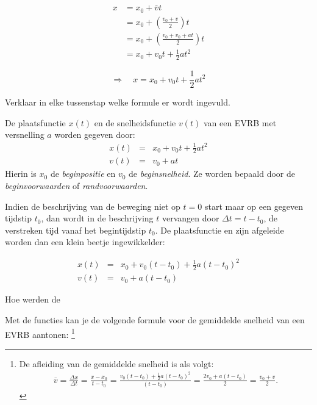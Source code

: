 \documentclass{ximera}
\begin{document}
\begin{align*}
	x &= x_0 + \bar{v}t \\
	  &= x_0 + \left( \frac{v_0 + v}{2} \right)t \\
	  &= x_0 + \left( \frac{v_0 + v_0 + at}{2} \right)t \\
	  &= x_0 + v_0 t + \frac{1}{2} at^2
\end{align*}

\[
\Rightarrow \quad x = x_0 + v_0 t + \frac{1}{2}at^2 
\]

\begin{quickquestion*}{}{}
	Verklaar in elke tussenstap welke formule er wordt ingevuld. 
\end{quickquestion*}


\begin{theorem}
De plaatsfunctie $x(t)$ en de snelheidsfunctie $v(t)$ van een EVRB met versnelling $a$ worden gegeven door:
\[
\begin{array}{rcl}
x(t)&=&x_0+v_0t+\frac{1}{2}at^2\\
v(t)&=&v_0+at
\end{array}
\]
Hierin is $x_0$ de \textit{beginpositie} en $v_0$ de \textit{beginsnelheid}. Ze worden bepaald door de \textit{beginvoorwaarden} of \textit{randvoorwaarden}.
\end{theorem}	

Indien de beschrijving van de beweging niet op $t=0$ start maar op een gegeven tijdstip $t_0$, dan wordt in de beschrijving $t$ vervangen door $\Delta t= t-t_0$, de verstreken tijd vanaf het begintijdstip $t_0$. De plaatsfunctie en zijn afgeleide worden dan een klein beetje ingewikkelder:

\[
\begin{array}{rcl}
x(t)&=&x_0+v_0(t-t_0)+\frac{1}{2}a(t-t_0)^2\\
v(t)&=&v_0+a(t-t_0)
\end{array}
\]



\begin{exercise}
	Hoe werden de 
\end{exercise}





Met de functies kan je de volgende formule voor de gemiddelde snelheid van een EVRB aantonen:%
\footnote{De afleiding van de gemiddelde snelheid is als volgt:
\begin{eqnarray*}
\overline{v}=\frac{\Delta x}{\Delta t}=\frac{x-x_0}{t-t_0}=\frac{v_0(t-t_0)+\frac{1}{2}a(t-t_0)^2}{(t-t_0)}=\frac{2v_0+a(t-t_0)}{2}=\frac{v_0+v}{2}.
\end{eqnarray*}}
\end{document}
